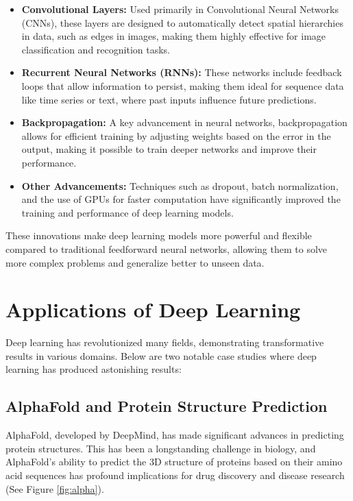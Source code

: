 \documentclass{llncs}
\begin{document}
\begin{itemize}
	\item \textbf{Convolutional Layers:} Used primarily in Convolutional Neural Networks (CNNs), these layers are designed to automatically detect spatial hierarchies in data, such as edges in images, making them highly effective for image classification and recognition tasks.
	\item \textbf{Recurrent Neural Networks (RNNs):} These networks include feedback loops that allow information to persist, making them ideal for sequence data like time series or text, where past inputs influence future predictions.
	\item \textbf{Backpropagation:} A key advancement in neural networks, backpropagation allows for efficient training by adjusting weights based on the error in the output, making it possible to train deeper networks and improve their performance.
	\item \textbf{Other Advancements:} Techniques such as dropout, batch normalization, and the use of GPUs for faster computation have significantly improved the training and performance of deep learning models.
\end{itemize}

These innovations make deep learning models more powerful and flexible compared to traditional feedforward neural networks, allowing them to solve more complex problems and generalize better to unseen data.\cite{turing}

\section{Applications of Deep Learning}

Deep learning has revolutionized many fields, demonstrating transformative results in various domains. Below are two notable case studies where deep learning has produced astonishing results:



\subsection{AlphaFold and Protein Structure Prediction}
AlphaFold, developed by DeepMind, has made significant advances in predicting protein structures. This has been a longstanding challenge in biology, and AlphaFold's ability to predict the 3D structure of proteins based on their amino acid sequences has profound implications for drug discovery and disease research \cite{alphafold2024} (See Figure \ref{fig:alpha}).
\end{document}
